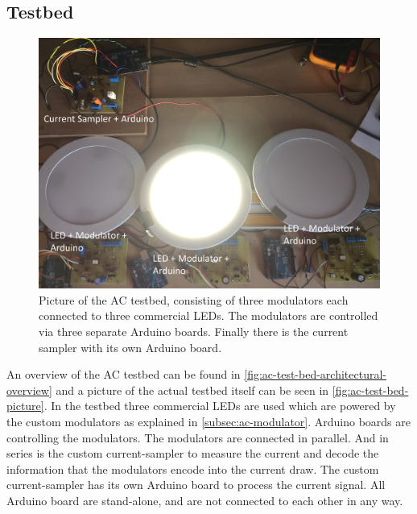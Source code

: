 

\subsection{Testbed}
\label{subsec:ac-testbed}

\begin{figure}[h]
	\centering
	\includegraphics[angle=0,width=\textwidth,height=.9\textheight,keepaspectratio]{chapters/hardware-chapters/AC/ac-test-bed/ac-test-bed-picture}
	\caption{Picture of the AC testbed, consisting of three modulators each connected to three commercial LEDs. The modulators are controlled via three separate Arduino boards. Finally there is the current sampler with its own Arduino board.}
	\label{fig:ac-test-bed-picture}
\end{figure}



An overview of the AC testbed can be found in \autoref{fig:ac-test-bed-architectural-overview} and a picture of the actual testbed itself can be seen in \autoref{fig:ac-test-bed-picture}.
In the testbed three commercial LEDs are used which are powered by the custom modulators as explained in \autoref{subsec:ac-modulator}.
Arduino boards are controlling the modulators.
The modulators are connected in parallel. 
And in series is the custom current-sampler to measure the current and decode the information that the modulators encode into the current draw.
The custom current-sampler has its own Arduino board to process the current signal.
All Arduino board are stand-alone, and are not connected to each other in any way.



